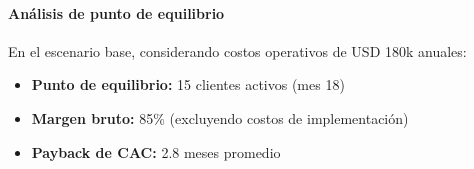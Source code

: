\paragraph{Análisis de punto de equilibrio}

En el escenario base, considerando costos operativos de USD 180k anuales:
\begin{itemize}
    \item \textbf{Punto de equilibrio:} 15 clientes activos (mes 18)
    \item \textbf{Margen bruto:} 85\% (excluyendo costos de implementación)
    \item \textbf{Payback de CAC:} 2.8 meses promedio
\end{itemize}
